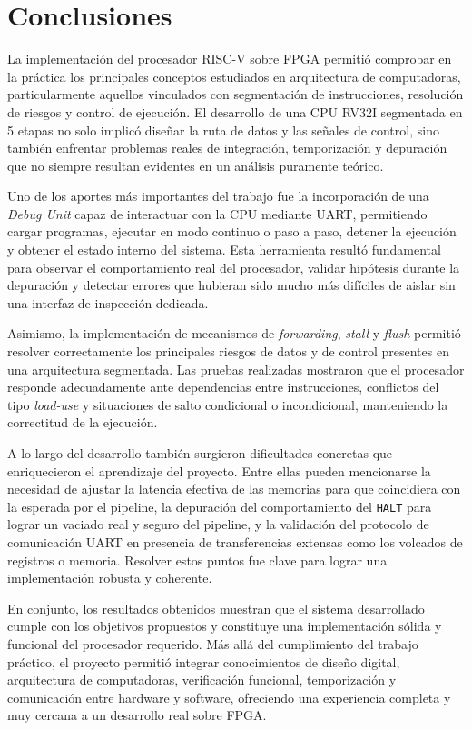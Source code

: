 \section{Conclusiones}
La implementación del procesador RISC-V sobre FPGA permitió comprobar en la práctica los principales conceptos estudiados en arquitectura de computadoras, particularmente aquellos vinculados con segmentación de instrucciones, resolución de riesgos y control de ejecución. El desarrollo de una CPU RV32I segmentada en 5 etapas no solo implicó diseñar la ruta de datos y las señales de control, sino también enfrentar problemas reales de integración, temporización y depuración que no siempre resultan evidentes en un análisis puramente teórico.

Uno de los aportes más importantes del trabajo fue la incorporación de una \textit{Debug Unit} capaz de interactuar con la CPU mediante UART, permitiendo cargar programas, ejecutar en modo continuo o paso a paso, detener la ejecución y obtener el estado interno del sistema. Esta herramienta resultó fundamental para observar el comportamiento real del procesador, validar hipótesis durante la depuración y detectar errores que hubieran sido mucho más difíciles de aislar sin una interfaz de inspección dedicada.

Asimismo, la implementación de mecanismos de \textit{forwarding}, \textit{stall} y \textit{flush} permitió resolver correctamente los principales riesgos de datos y de control presentes en una arquitectura segmentada. Las pruebas realizadas mostraron que el procesador responde adecuadamente ante dependencias entre instrucciones, conflictos del tipo \textit{load-use} y situaciones de salto condicional o incondicional, manteniendo la correctitud de la ejecución.

A lo largo del desarrollo también surgieron dificultades concretas que enriquecieron el aprendizaje del proyecto. Entre ellas pueden mencionarse la necesidad de ajustar la latencia efectiva de las memorias para que coincidiera con la esperada por el pipeline, la depuración del comportamiento del \texttt{HALT} para lograr un vaciado real y seguro del pipeline, y la validación del protocolo de comunicación UART en presencia de transferencias extensas como los volcados de registros o memoria. Resolver estos puntos fue clave para lograr una implementación robusta y coherente.

En conjunto, los resultados obtenidos muestran que el sistema desarrollado cumple con los objetivos propuestos y constituye una implementación sólida y funcional del procesador requerido. Más allá del cumplimiento del trabajo práctico, el proyecto permitió integrar conocimientos de diseño digital, arquitectura de computadoras, verificación funcional, temporización y comunicación entre hardware y software, ofreciendo una experiencia completa y muy cercana a un desarrollo real sobre FPGA.